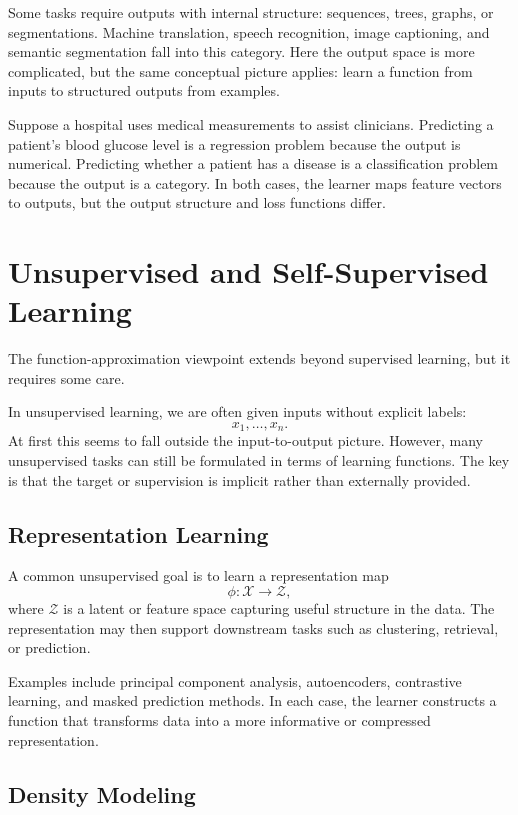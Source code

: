 Some tasks require outputs with internal structure: sequences, trees, graphs, or segmentations. Machine translation, speech recognition, image captioning, and semantic segmentation fall into this category. Here the output space is more complicated, but the same conceptual picture applies: learn a function from inputs to structured outputs from examples.

\begin{example}
Suppose a hospital uses medical measurements to assist clinicians. Predicting a patient's blood glucose level is a regression problem because the output is numerical. Predicting whether a patient has a disease is a classification problem because the output is a category. In both cases, the learner maps feature vectors to outputs, but the output structure and loss functions differ.
\end{example}

\section{Unsupervised and Self-Supervised Learning}

The function-approximation viewpoint extends beyond supervised learning, but it requires some care.

In unsupervised learning, we are often given inputs without explicit labels:
\[
x_1,\dots,x_n.
\]
At first this seems to fall outside the input-to-output picture. However, many unsupervised tasks can still be formulated in terms of learning functions. The key is that the target or supervision is implicit rather than externally provided.

\subsection{Representation Learning}

A common unsupervised goal is to learn a representation map
\[
\phi : \mathcal{X} \to \mathcal{Z},
\]
where $\mathcal{Z}$ is a latent or feature space capturing useful structure in the data. The representation may then support downstream tasks such as clustering, retrieval, or prediction.

Examples include principal component analysis, autoencoders, contrastive learning, and masked prediction methods. In each case, the learner constructs a function that transforms data into a more informative or compressed representation.

\subsection{Density Modeling}

